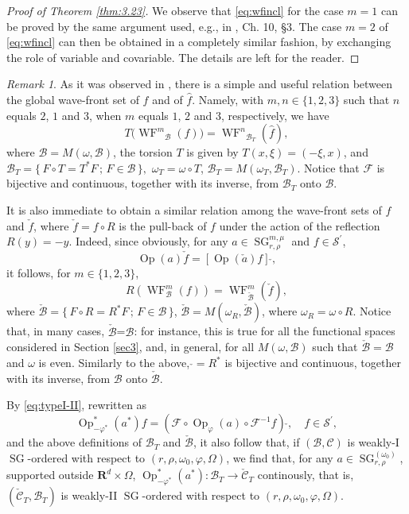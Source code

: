 \documentclass[12pt,a4paper,reqno]{amsart}
\numberwithin{equation}{section}
\numberwithin{thm}{section}
\theoremstyle{definition}
\theoremstyle{remark}
\newtheorem{rem}[thm]{Remark}
\begin{document}
\begin{proof}[Proof of Theorem \ref{thm:3.23}]
	We observe that \eqref{eq:wfincl} for the case $m=1$ can be proved by the same argument used, e.g.,
	in \cite{Ku}, Ch. 10, \S 3. The case $m=2$ of \eqref{eq:wfincl} can then be obtained in a completely
	similar fashion, by exchanging the role of variable and covariable. The
	details are left for the reader.
\end{proof}

\begin{rem}
As it was observed in \cite{CJT2}, there is a simple and useful relation between the global 
wave-front set of $f$ and of $\widehat{f}$. Namely, with $m, n\in \{ 1,2,3 \}$ such that $n$ 
equals $2$, $1$ and $3$, when $m$ equals $1$, $2$ and $3$, respectively, we have
\[
	T \big ({\operatorname{WF}^{{m}}}_{{\mathcal B}}(f) \big ) = {\operatorname{WF}^{{n}}}_{{{\mathcal B}}_T}(\widehat f),
\]
where ${{\mathcal B}}=M(\omega,\mathscr B)$, the torsion $T$ is given by
$T(x,\xi)=(-\xi,x)$, and $\mathscr B_T={\{ \, {F\circ T=T^*F}\, ;\, {F\in \mathscr B}\, \} },$
$\omega_T=\omega\circ T$, ${{\mathcal B}}_T=M(\omega_T,\mathscr B_T)$. Notice that
${{\mathscr F}}$ is bijective and continuous, together with its inverse, from ${{\mathcal B}}_T$ onto ${{\mathcal B}}$.

It is also
immediate to obtain a similar relation among the wave-front sets of $f$ and $\check{f}$,
where $\check{f}=f\circ R$ is the pull-back of $f$ under the action of the reflection $R(y)=-y$.
Indeed, since obviously, for any $a\in{\operatorname{SG}}^{m,\mu}_{r,\rho}$ and $f\in{{\mathscr S}}^\prime$,
\[
	{\operatorname{Op}}(a)\check{f}=[{\operatorname{Op}}({\check{a}})f]\,\check{},
\]
it follows, for $m\in\{1,2,3\}$,
\[
	R({\operatorname{WF}}^m_{{\mathcal B}}(f))={\operatorname{WF}}^m_{\check{{\mathcal B}}}(\check{f}),
\]
where $\check{\mathscr B}={\{ \, {F\circ R=R^*F}\, ;\, {F\in \mathscr B}\, \} }$,
$\check{{\mathcal B}}=M(\omega_R,\check{\mathscr B})$, where
$\omega_R=\omega\circ R$. Notice that, in many cases, $\check{{\mathcal B}}$=${{\mathcal B}}$:
for instance, this is true for all the functional spaces considered in Section \ref{sec3}, and, in general,
for all $M(\omega,\mathscr{B})$ such that $\check{\mathscr{B}}=\mathscr{B}$ and $\omega$ is even. 
Similarly to the above, $\check{}=R^*$ is bijective and continuous, together with its inverse, from 
${{\mathcal B}}$ onto $\check{{\mathcal B}}$.

By \eqref{eq:typeI-II}, rewritten as
\[
	{\operatorname{Op}}^*_{-\varphi^*}(a^*)f=({{\mathscr F}}\circ{\operatorname{Op}}_\varphi(a)\circ{{\mathscr F}}^{-1}f)\,{\check{}},
	\quad f\in{{\mathscr S}}^\prime,
\]
and the above definitions of ${{\mathcal B}}_T$ and $\check{{\mathcal B}}$,
it also follow that, if $({{\mathcal B}},{{\mathcal C}})$ is weakly-I ${\operatorname{SG}}$-ordered with
respect to $(r,\rho ,\omega _0,\varphi ,\Omega )$,
we find that, for any $a\in{\operatorname{SG}}^{(\omega_0)}_{r,\rho}$, supported
outside ${\mathbf R^{{d}}}\times\Omega$,
${\operatorname{Op}}^*_{-\varphi^*}(a^*)\colon{{\mathcal B}}_T\rightarrow\check{{\mathcal C}}_T$
continously, that is, $(\check{{\mathcal C}}_T,{{\mathcal B}}_T)$ is weakly-II ${\operatorname{SG}}$-ordered
with respect to $(r,\rho ,\omega _0,\varphi ,\Omega )$.
\end{rem}
\end{document}
